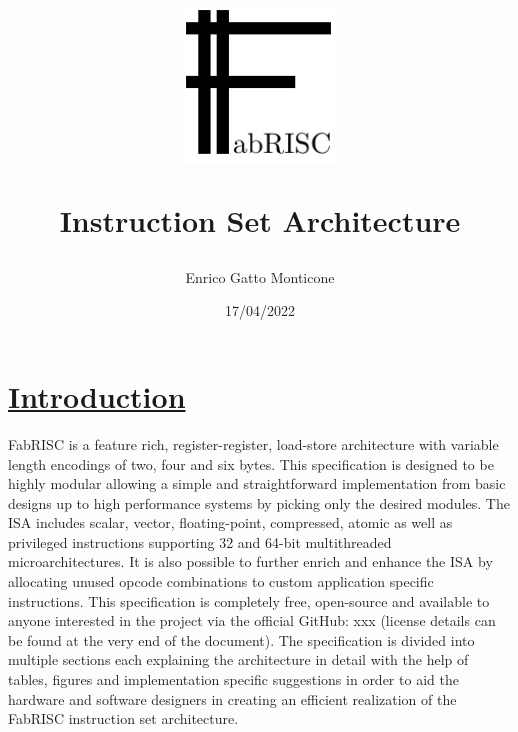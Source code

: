 \documentclass{article}
\title{\includegraphics[width=4cm]{./Images/LOGO.pdf} \par\noindent\huge{Instruction Set Architecture}}
\date{17/04/2022}
\author{Enrico Gatto Monticone}
\begin{document}
	\maketitle
	\newpage

	\tableofcontents
    \listoftables
	\newpage

    \section[Introduction]{\LARGE\underline{Introduction}} %

        \vspace{10pt}

        FabRISC is a feature rich, register-register, load-store architecture with variable length encodings of two, four and six bytes. This specification is designed to be highly modular allowing a simple and straightforward implementation from basic designs up to high performance systems by picking only the desired modules. The ISA includes scalar, vector, floating-point, compressed, atomic as well as privileged instructions supporting 32 and 64-bit multithreaded microarchitectures. It is also possible to further enrich and enhance the ISA by allocating unused opcode combinations to custom application specific instructions. This specification is completely free, open-source and available to anyone interested in the project via the official GitHub: xxx (license details can be found at the very end of the document). The specification is divided into multiple sections each explaining the architecture in detail with the help of tables, figures and implementation specific suggestions in order to aid the hardware and software designers in creating an efficient realization of the FabRISC instruction set architecture.
\end{document}
